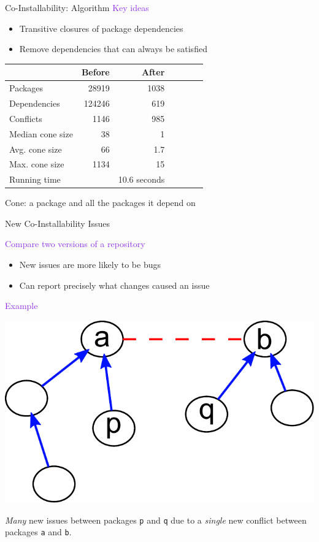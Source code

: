 \documentclass[xcolor={dvipsnames}]{beamer}
\newcommand{\EEE}[1]{\textcolor{BlueViolet}{#1}}
\begin{document}
\begin{frame}{Co-Installability: Algorithm}
\EEE{Key ideas}
\begin{itemize}
\item Transitive closures of package dependencies
\item Remove dependencies that can always be satisfied
\end{itemize}

\begin{center}
\begin{tabular}{@{}lrrrrrr@{}}
\toprule
& Before & After \\
\midrule
Packages & 28919 & 1038 \\
Dependencies & 124246 & 619 \\
Conflicts & 1146 & 985 \\
Median cone size & 38 & 1 \\
Avg. cone size & 66 & 1.7 \\
Max. cone size & 1134 & 15 \\
\midrule
Running time
& & 10.6 seconds
\\
\bottomrule
\end{tabular}
\end{center}
Cone: a package and all the packages it depend on

\end{frame}

\begin{frame}{New Co-Installability Issues}

\EEE{Compare two versions of a repository}
\begin{itemize}
\item New issues are more likely to be bugs
\item Can report precisely what changes caused an issue
\end{itemize}

\vspace{1em}

\EEE{Example}
\vspace{-2em}
\begin{center}
\includegraphics[width=0.4\linewidth]{upgrades}

\vspace{1em}
\begin{minipage}{\dimexpr\textwidth-2.5cm}
\emph{Many} new issues between packages \texttt{p} and \texttt{q} due to a
\emph{single} new conflict between packages \texttt{a} and \texttt{b}.
\end{minipage}
\end{center}
\end{frame}
\end{document}
